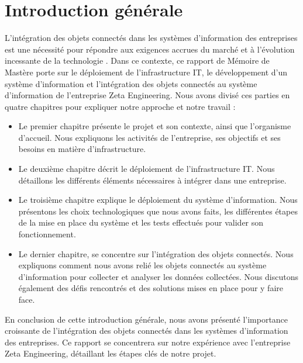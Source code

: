 \chapter*{Introduction générale}
\large {

\setlength{\parskip}{1em}
\setlength{\parindent}{1cm}

L'intégration des objets connectés dans les systèmes d’information des entreprises est une nécessité pour répondre aux exigences accrues du marché et à l’évolution incessante de la technologie \cite{antoine2019vers}. Dans ce contexte, ce rapport de Mémoire de Mastère porte sur le déploiement de l'infrastructure IT, le développement d'un système d'information et l'intégration des objets connectés au système d’information de l’entreprise Zeta Engineering.  Nous avons divisé ces parties en quatre chapitres pour expliquer notre approche et notre travail :

\begin{itemize}
\item Le premier chapitre présente le projet et son contexte, ainsi que l'organisme d'accueil. Nous expliquons les activités de l'entreprise, ses objectifs et ses besoins en matière d'infrastructure. 
\item Le deuxième chapitre décrit le déploiement de l'infrastructure IT. Nous détaillons les différents éléments nécessaires à intégrer dans une entreprise. 
\item Le troisième chapitre explique le déploiement du système d'information. Nous présentons les choix technologiques que nous avons faits, les différentes étapes de la mise en place du système et les tests effectués pour valider son fonctionnement. 
\item Le dernier chapitre, se concentre sur l'intégration des objets connectés. Nous expliquons comment nous avons relié les objets connectés au système d'information pour collecter et analyser les données collectées. Nous discutons également des défis rencontrés et des solutions mises en place pour y faire face.
\end{itemize}

En conclusion de cette introduction générale, nous avons présenté l'importance croissante de l'intégration des objets connectés dans les systèmes d’information des entreprises. Ce rapport se concentrera sur notre expérience avec l'entreprise Zeta Engineering, détaillant les étapes clés de notre projet.



}